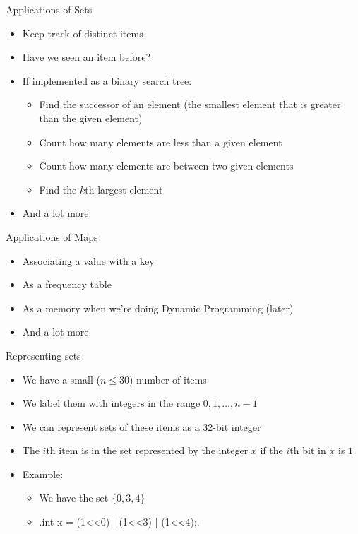 \documentclass[12pt,t]{beamer}
\newcommand{\bi}{\begin{itemize}}
\newcommand{\ei}{\end{itemize}}
\begin{document}
\begin{frame}{Applications of Sets}
    \bi
        \item Keep track of distinct items
        \item Have we seen an item before?
        \item If implemented as a binary search tree:
            \bi
        \item Find the successor of an element (the smallest element that is greater than the given element)
        \item Count how many elements are less than a given element
        \item Count how many elements are between two given elements
        \item Find the $k$th largest element
            \ei

        \item And a lot more
    \ei
\end{frame}

\begin{frame}{Applications of Maps}
    \bi
        \item Associating a value with a key
        \item As a frequency table
        \item As a memory when we're doing Dynamic Programming (later)
        \item And a lot more
    \ei
\end{frame}



\begin{frame}[fragile]{Representing sets}
    \vspace{30pt}
    \bi
        \item We have a small ($n\leq 30$) number of items
        \item We label them with integers in the range $0,1,\ldots,n-1$
        \item We can represent sets of these items as a 32-bit integer
        \item The $i$th item is in the set represented by the integer $x$ if the $i$th bit in $x$ is $1$
        \item Example:
            \bi
                \item We have the set $\{0,3,4\}$
                \item {}.int x = (1<<0) | (1<<3) | (1<<4);.
            \ei
    \ei
\end{frame}
\end{document}

